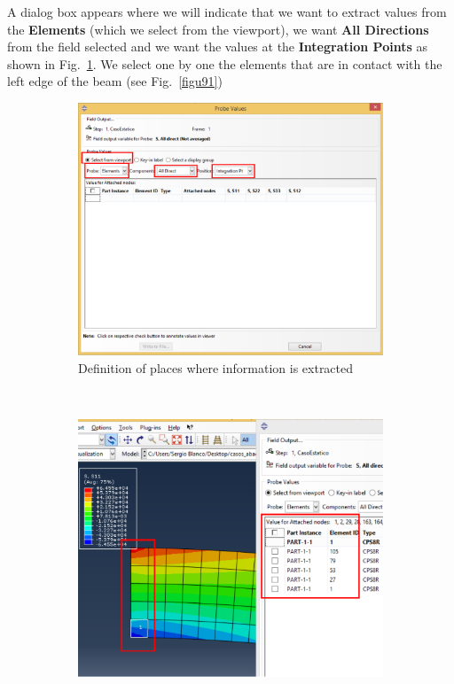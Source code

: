 \begin{enumerate}
  A dialog box appears where we will indicate that we want to extract
  values from the \textbf {Elements} (which we select from the viewport),  we want \textbf{All
    Directions} from the field selected and we want the values at the \textbf{Integration
    Points} as shown in Fig.~\ref{figu90}. We select one by one the
  elements that are in contact with the left edge of the beam (see
  Fig.~\ref{figu91})


 \begin{figure}[H]
   \centering
   \begin{subfigure}{0.45\textwidth}
     \includegraphics[width=\textwidth]{./body/images/imagen90.pdf}
     \caption{Definition of places where information is extracted}
     \label{figu90}
   \end{subfigure}%
   ~ %
   \begin{subfigure}{0.49\textwidth}
     \includegraphics[width=\textwidth]{./body/images/imagen91.pdf}

\end{subfigure}
\end{figure}
\end{enumerate}
